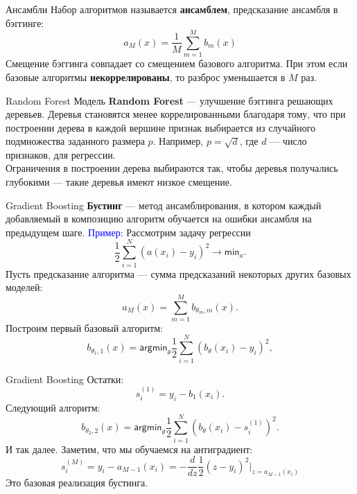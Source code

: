 \documentclass[handout]{beamer}
\begin{document}
\begin{frame}{Ансамбли}
	Набор алгоритмов называется \textbf{ансамблем}, предсказание ансамбля в бэггинге:
	\begin{equation*}
		a_M(x)=\frac{1}{M}\sum_{m=1}^{M}b_m(x)
	\end{equation*}
	Смещение бэггинга совпадает со смещением базового алгоритма. При этом если базовые алгоритмы \textbf{некоррелированы}, то разброс уменьшается в $M$ раз.

\end{frame}

\begin{frame}{Random Forest}
	Модель \textbf{Random Forest} --- улучшение бэггинга решающих деревьев. Деревья становятся менее коррелированными благодаря тому, что при построении дерева в каждой вершине признак выбирается из случайного подмножества заданного размера $p$. Например, $p=\sqrt{d}$, где $d$ --- число признаков, для регрессии.\\
	Ограничения в построении дерева выбираются так, чтобы деревья получались глубокими --- такие деревья имеют низкое смещение.
\end{frame}

\begin{frame}{Gradient Boosting}
	\textbf{Бустинг} --- метод ансамблирования, в котором каждый добавляемый в композицию алгоритм обучается на ошибки ансамбля на предыдущем шаге.
	\textcolor{blue}{Пример}: Рассмотрим задачу регрессии
	\begin{equation}
		\frac{1}{2}\sum_{i=1}^{N}(a(x_i)-y_i)^2\rightarrow\mathsf{min}_a.
	\end{equation}
	Пусть предсказание алгоритма --- сумма предсказаний некоторых других базовых моделей:
	\begin{equation*}
		a_M(x)=\sum_{m=1}^Mb_{\theta_m, m}(x).
	\end{equation*}
	Построим первый базовый алгоритм:
	\begin{equation*}
		b_{\theta_1, 1}(x)=\mathsf{argmin}_{\theta}\frac{1}{2}\sum_{i=1}^N(b_{\theta}(x_i)-y_i)^2,
	\end{equation*}
\end{frame}

\begin{frame}{Gradient Boosting}
	Остатки:
	\begin{equation*}
		s_i^{(1)}=y_i-b_1(x_i).
	\end{equation*}
	Следующий алгоритм:
	\begin{equation*}
		b_{\theta_2,2}(x)=\mathsf{argmin}_{\theta}\frac{1}{2}\sum_{i=1}^N(b_{\theta}(x_i)-s_i^{(1)})^2.
	\end{equation*}
	И так далее. Заметим, что мы обучаемся на антиградиент:
	\begin{equation*}
		s_i^{(M)}=y_i-a_{M-1}(x_i)=-\frac{d}{dz}\frac{1}{2}(z-y_i)^2|_{z=a_{M-1}(x_i)}
	\end{equation*}
	Это базовая реализация бустинга.
\end{frame}
\end{document}
